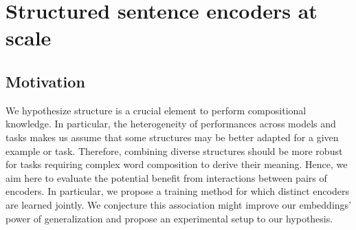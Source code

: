 \setchapterpreamble[u]{\margintoc}
\chapter{Structured sentence encoders at scale}








\section{Motivation}

We hypothesize structure is a crucial element to perform compositional knowledge. In particular, the heterogeneity of performances across models and tasks makes us assume that some structures may be better adapted for a given example or task. Therefore, combining diverse structures should be more robust for tasks requiring complex word composition to derive their meaning. Hence, we aim here to evaluate the potential benefit from interactions between pairs of encoders. In particular, we propose a training method for which distinct encoders are learned jointly. We conjecture this association might improve our embeddings' power of generalization and propose an experimental setup to  our hypothesis.

